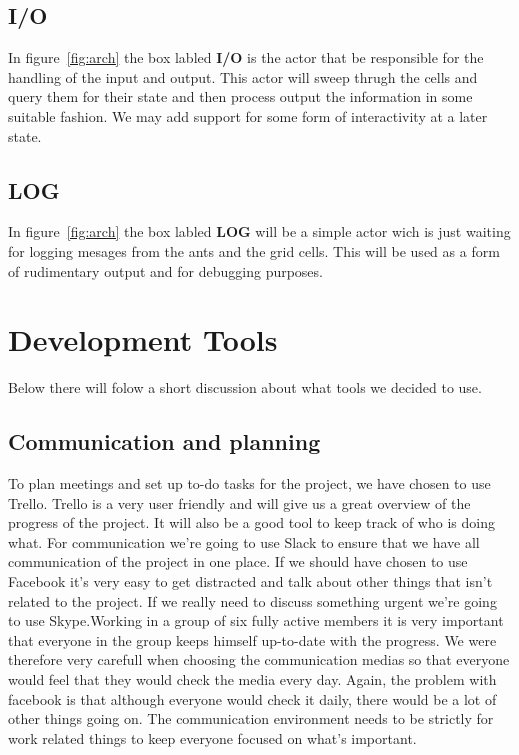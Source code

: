\documentclass[a4paper]{article}
\begin{document}
\subsection{I/O}
In figure~\ref{fig:arch} the box labled \textbf{I/O} is the actor that be
responsible for the handling of the input and output. This actor will sweep thrugh the cells and
query them for their state and then process output the information in some
suitable fashion. We may add support for some form of interactivity at a later
state.

\subsection{LOG}
In figure~\ref{fig:arch} the box labled \textbf{LOG} will be a simple actor wich
is just waiting for logging mesages from the ants and the grid cells. This will be
used as a form of rudimentary output and for debugging purposes.


\section{Development Tools}
Below there will folow a short discussion about what tools we decided to use.
\subsection{Communication and planning}
To plan meetings and set up to-do tasks
for the project, we have chosen to use Trello. Trello is a very user friendly and will
give us a great overview of the progress of the project. It will also be a good
tool to keep track of who is doing what. For communication we’re going to use
Slack to ensure that we have all communication of the project in one place. If
we should have chosen to use Facebook it’s very easy to get distracted and talk
about other things that isn’t related to the project. If we really need to discuss
something urgent we’re going to use Skype.Working in a group of six fully active members
it is very important that everyone in the group keeps himself up-to-date with the progress. 
We were therefore very carefull when choosing the communication medias so that everyone would
feel that they would check the media every day. Again, the problem with facebook is that 
although everyone would check it daily, there would be a lot of other things going on.
The communication environment needs to be strictly for work related things to keep everyone
focused on what's important.
\end{document}
